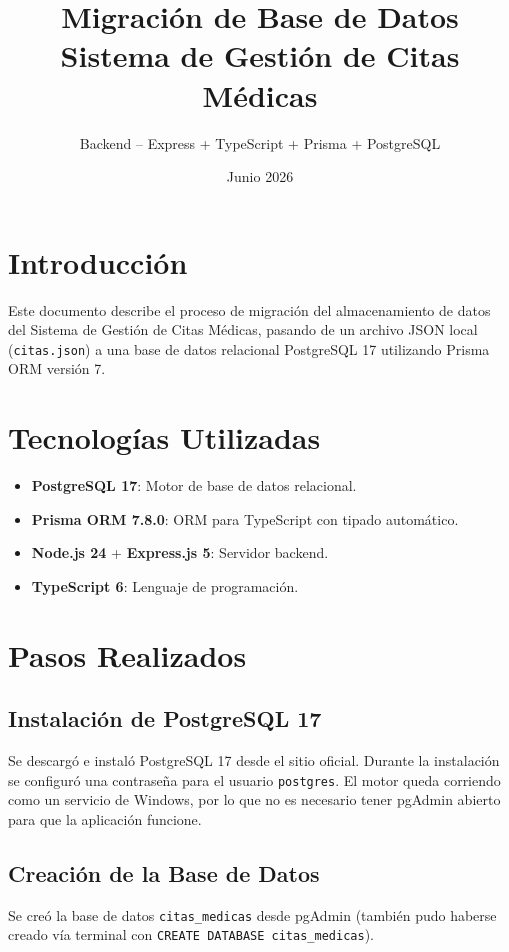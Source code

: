 \documentclass[12pt,a4paper]{article}
\title{\textbf{Migración de Base de Datos}\\Sistema de Gestión de Citas Médicas}
\author{Backend -- Express + TypeScript + Prisma + PostgreSQL}
\date{Junio 2026}
\begin{document}
\maketitle

\section{Introducción}
Este documento describe el proceso de migración del almacenamiento de datos del Sistema de Gestión de Citas Médicas, pasando de un archivo JSON local (\texttt{citas.json}) a una base de datos relacional PostgreSQL 17 utilizando Prisma ORM versión 7.

\section{Tecnologías Utilizadas}
\begin{itemize}
    \item \textbf{PostgreSQL 17}: Motor de base de datos relacional.
    \item \textbf{Prisma ORM 7.8.0}: ORM para TypeScript con tipado automático.
    \item \textbf{Node.js 24} + \textbf{Express.js 5}: Servidor backend.
    \item \textbf{TypeScript 6}: Lenguaje de programación.
\end{itemize}

\section{Pasos Realizados}

\subsection{Instalación de PostgreSQL 17}
Se descargó e instaló PostgreSQL 17 desde el sitio oficial. Durante la instalación se configuró una contraseña para el usuario \texttt{postgres}. El motor queda corriendo como un servicio de Windows, por lo que no es necesario tener pgAdmin abierto para que la aplicación funcione.

\subsection{Creación de la Base de Datos}
Se creó la base de datos \texttt{citas\_medicas} desde pgAdmin (también pudo haberse creado vía terminal con \texttt{CREATE DATABASE citas\_medicas}).
\end{document}
